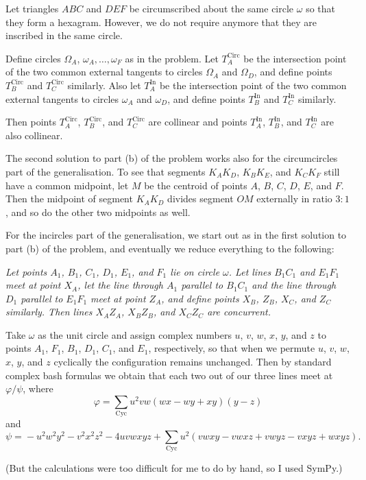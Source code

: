 \begin{remark*}
Let triangles $ABC$ and $DEF$ be circumscribed about the same circle $\omega$ so that they form a hexagram. However, we do not require anymore that they are inscribed in the same circle.

Define circles $\Omega_A$, $\omega_A, \dots, \omega_F$ as in the problem.
Let $T^\text{Circ}_A$ be the intersection point of the two common external
tangents to circles $\Omega_A$ and $\Omega_D$, and define points $T^\text{Circ}_B$
and $T^\text{Circ}_C$ similarly. Also let $T^\text{In}_A$ be the intersection
point of the two common external tangents to circles $\omega_A$ and $\omega_D$, and define
points $T^\text{In}_B$ and $T^\text{In}_C$ similarly.

Then points $T^\text{Circ}_A$, $T^\text{Circ}_B$, and $T^\text{Circ}_C$ are collinear
and points $T^\text{In}_A$, $T^\text{In}_B$, and $T^\text{In}_C$ are also
collinear.

The second solution to part (b) of the problem works also for the circumcircles
part of the generalisation. To see that segments $K_AK_D$, $K_BK_E$, and
$K_CK_F$ still have a common midpoint, let $M$ be the centroid of points $A$,
$B$, $C$, $D$, $E$, and $F$. Then the midpoint of segment $K_AK_D$ divides
segment $OM$ externally in ratio $3 : 1$, and so do the other two midpoints as
well.

For the incircles part of the generalisation, we start out as in the first
solution to part (b) of the problem, and eventually we reduce everything to the
following:

\emph{Let points $A_1$, $B_1$, $C_1$, $D_1$, $E_1$, and $F_1$ lie on circle $\omega$. Let lines $B_1C_1$ and $E_1F_1$ meet at point $X_A$, let the line through $A_1$ parallel to $B_1C_1$ and the line through $D_1$ parallel to $E_1F_1$ meet at point $Z_A$, and define points $X_B$, $Z_B$, $X_C$, and $Z_C$ similarly. Then lines $X_AZ_A$, $X_BZ_B$, and $X_CZ_C$ are concurrent.}

Take $\omega$ as the unit circle and assign complex numbers $u$, $v$, $w$, $x$, $y$, and $z$ to points $A_1$, $F_1$, $B_1$, $D_1$, $C_1$, and $E_1$, respectively, so that when we permute $u$, $v$, $w$, $x$, $y$, and $z$ cyclically the configuration remains unchanged. Then by standard complex bash formulas we obtain that each two out of our three lines meet at $\varphi/\psi$, where \[\varphi = \sum_\text{Cyc} u^2vw(wx - wy + xy)(y - z)\] and \[\psi = {} - u^2w^2y^2 - v^2x^2z^2 - 4uvwxyz + \sum_\text{Cyc} u^2(vwxy - vwxz + vwyz - vxyz + wxyz).\]

(But the calculations were too difficult for me to do by hand, so I used SymPy.)
\end{remark*}

